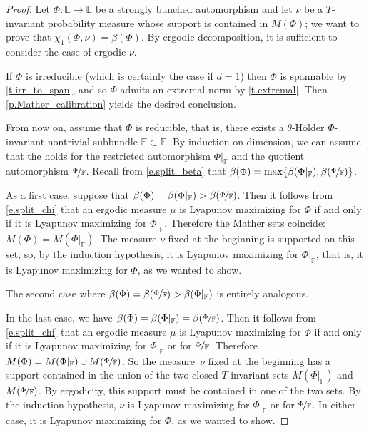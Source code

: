 \documentclass[JEP,XML,SOM,Unicode]{cedram}
\theoremstyle{plain}
\theoremstyle{definition}
\newcommand{\EE}{\mathbb{E}}
\newcommand{\FF}{\mathbb{F}}
\begin{document}
\begin{proof}
Let $\Phi \colon \EE \to \EE$ be a strongly bunched automorphism and let $\nu$ be a $T$\nobreakdash-invariant probability measure whose support is contained in $M(\Phi)$; we want to prove that $\chi_1(\Phi, \nu) = \beta(\Phi)$.
By ergodic decomposition, it is sufficient to consider the case of ergodic $\nu$.

If $\Phi$ is irreducible (which is certainly the case if $d=1$) then $\Phi$ is spannable by \cref{t.irr_to_span}, and so $\Phi$ admits an extremal norm by \cref{t.extremal}. Then \cref{p.Mather_calibration} yields the desired conclusion.

From now on, assume that $\Phi$ is reducible, that is, there exists a $\theta$-Hölder $\Phi$-invariant nontrivial subbundle $\FF \subset \EE$.
By induction on dimension, we can assume that the  holds for the restricted automorphism $\Phi|_{\FF}$ and the quotient automorphism $\nicefrac{\Phi}{\FF}$.
Recall from \eqref{e.split_beta} that $\beta(\Phi) = \max\{ \beta(\Phi|_{\FF}), \beta(\nicefrac{\Phi}{\FF}) \}$.

As a first case, suppose that $\beta(\Phi) = \beta(\Phi|_{\FF}) > \beta(\nicefrac{\Phi}{\FF})$.
Then it follows from \eqref{e.split_chi} that an ergodic measure $\mu$ is Lyapunov maximizing for $\Phi$ if and only if it is Lyapunov maximizing for $\Phi|_{\FF}$.
Therefore the Mather sets coincide: $M(\Phi) = M(\Phi|_{\FF})$.
The measure $\nu$ fixed at the beginning is supported on this set; so, by the induction hypothesis, it is Lyapunov maximizing for $\Phi|_{\FF}$, that is, it is Lyapunov maximizing for $\Phi$, as we wanted to show.

The second case where $\beta(\Phi) = \beta(\nicefrac{\Phi}{\FF}) > \beta(\Phi|_{\FF})$ is entirely analogous.

In the last case, we have $\beta(\Phi) = \beta(\Phi|_{\FF}) = \beta(\nicefrac{\Phi}{\FF})$.
Then it follows from \eqref{e.split_chi} that an ergodic measure $\mu$ is Lyapunov maximizing for $\Phi$ if and only if it is Lyapunov maximizing for $\Phi|_{\FF}$ or for $\nicefrac{\Phi}{\FF}$.
Therefore $M(\Phi) = M(\Phi|_{\FF}) \cup M(\nicefrac{\Phi}{\FF})$.
So the measure~$\nu$ fixed at the beginning has a support contained in the union of the two closed $T$\nobreakdash-invariant sets
$M(\Phi|_{\FF})$ and $M(\nicefrac{\Phi}{\FF})$.
By ergodicity,
this support must be contained in one of the two sets.
By the induction hypothesis, $\nu$ is Lyapunov maximizing for $\Phi|_{\FF}$ or for $\nicefrac{\Phi}{\FF}$.
In either case, it is Lyapunov maximizing for $\Phi$, as we wanted to show.
\end{proof}
\end{document}
